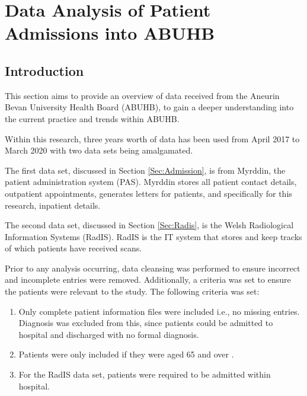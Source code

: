 \documentclass[../thesis.tex]{subfiles}
\begin{document}
\chapter{Data Analysis of Patient Admissions into ABUHB}\label{chp:Data}

\section{Introduction}
This section aims to provide an overview of data received from the Aneurin Bevan University Health Board (ABUHB), to gain a deeper understanding into the current practice and trends within ABUHB.

Within this research, three years worth of data has been used from April 2017 to March 2020 with two data sets being amalgamated. 


The first data set, discussed in Section \ref{Sec:Admission}, is from Myrddin, the patient administration system (PAS). Myrddin stores all patient contact details, outpatient appointments, generates letters for patients, and specifically for this research, inpatient details.

The second data set, discussed in Section \ref{Sec:Radis}, is the Welsh Radiological Information Systems (RadIS). RadIS is the IT system that stores and keep tracks of which patients have received scans. 


Prior to any analysis occurring, data cleansing was performed to ensure incorrect and incomplete entries were removed. Additionally, a criteria was set to ensure the patients were relevant to the study. The following criteria was set:
\begin{enumerate}
    \item Only complete patient information files were included i.e., no missing entries. Diagnosis was excluded from this, since patients could be admitted to hospital and discharged with no formal diagnosis.
    \item Patients were only included if they were aged 65 and over \cite{OECD}.
    \item For the RadIS data set, patients were required to be admitted within hospital.
\end{enumerate}
\end{document}
